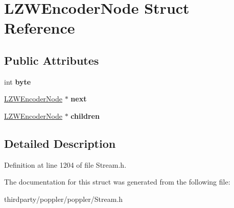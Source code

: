 \hypertarget{struct_l_z_w_encoder_node}{}\section{L\+Z\+W\+Encoder\+Node Struct Reference}
\label{struct_l_z_w_encoder_node}
\subsection*{Public Attributes}
\begin{DoxyCompactItemize}
\item 
\mbox{\label{struct_l_z_w_encoder_node_a5923356e3d67c56048d8f5ed42463153}} 
int {\bfseries byte}
\item 
\mbox{\label{struct_l_z_w_encoder_node_a8aa186520f7797663a07e6bd162bf81c}} 
\hyperlink{struct_l_z_w_encoder_node}{L\+Z\+W\+Encoder\+Node} $\ast$ {\bfseries next}
\item 
\mbox{\label{struct_l_z_w_encoder_node_a1c3377fe62a758df851e53c0c0fb62eb}} 
\hyperlink{struct_l_z_w_encoder_node}{L\+Z\+W\+Encoder\+Node} $\ast$ {\bfseries children}
\end{DoxyCompactItemize}


\subsection{Detailed Description}


Definition at line 1204 of file Stream.\+h.



The documentation for this struct was generated from the following file\+:\begin{DoxyCompactItemize}
\item 
thirdparty/poppler/poppler/Stream.\+h\end{DoxyCompactItemize}
